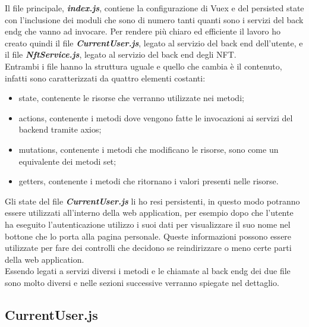 Il file principale, \textbf{\textit{index.js}}, contiene la configurazione di Vuex e del persisted state con l'inclusione dei moduli che sono di numero tanti quanti sono i servizi del \gls{back endg} che vanno ad invocare. Per rendere più chiaro ed efficiente il lavoro ho creato quindi il file \textbf{\textit{CurrentUser.js}}, legato al servizio del back end dell'utente, e il file \textbf{\textit{NftService.js}}, legato al servizio del back end degli NFT.\\
Entrambi i file hanno la struttura uguale e quello che cambia è il contenuto, infatti sono caratterizzati da quattro elementi costanti:
\begin{itemize}
	\item state, contenente le risorse che verranno utilizzate nei metodi;
	\item actions, contenente i metodi dove vengono fatte le invocazioni ai servizi del backend tramite axios;
	\item mutations, contenente i metodi che modificano le risorse, sono come un equivalente dei metodi set;
	\item getters, contenente i metodi che ritornano i valori presenti nelle risorse.
\end{itemize}

Gli state del file \textbf{\textit{CurrentUser.js}} li ho resi persistenti, in questo modo potranno essere utilizzati all'interno della web application, per esempio dopo che l'utente ha eseguito l'autenticazione utilizzo i suoi dati per visualizzare il suo nome nel bottone che lo porta alla pagina personale. Queste informazioni possono essere utilizzate per fare dei controlli che decidono se reindirizzare o meno certe parti della web application.\\
Essendo legati a servizi diversi i metodi e le chiamate al \gls{back endg} dei due file sono molto diversi e nelle sezioni successive verranno spiegate nel dettaglio.

\subsection{CurrentUser.js}
\label{subsec:currentuser}

